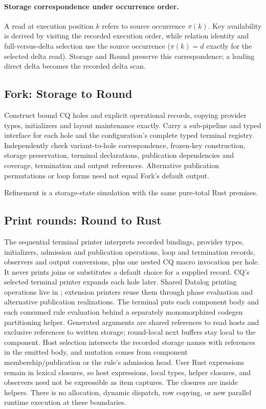 \paragraph{Storage correspondence under occurrence order.}
A read at execution position $k$ refers to source occurrence $\pi(k)$.
Key availability is derived by visiting the recorded execution order, while
relation identity and full-versus-delta selection use the source occurrence
($\pi(k)=d$ exactly for the selected delta read).  Storage and Round preserve
this correspondence; a leading direct delta becomes the recorded delta scan.

\subsection{Fork: Storage to Round}
Construct bound CQ holes and explicit operational records, copying provider
types, initializers and layout maintenance exactly. Carry a sub-pipeline and
typed interface for each hole and the configuration's complete typed terminal
registry. Independently check variant-to-hole correspondence, frozen-key
construction, storage preservation, terminal declarations, publication
dependencies and coverage, termination and output references. Alternative
publication permutations or loop forms need not equal Fork's default output.
\begin{mathpar}
\end{mathpar}
Refinement is a storage-state simulation with the same pure-total Rust premises.

\subsection{Print rounds: Round to Rust}
The sequential terminal printer interprets recorded bindings, provider types,
initializers, admission and publication operations, loop and termination
records, observers and output conversions, plus one nested CQ macro invocation
per hole. It never prints joins or substitutes a default choice for a supplied
record. CQ's selected terminal printer expands each hole later. Shared Datalog
printing operations live in ; extension printers reuse
them through phase evaluation and alternative publication realizations.
The terminal puts each component body and each consumed rule evaluation behind
a separately monomorphized codegen partitioning helper. Generated arguments are
shared references to read hosts and exclusive references to written storage;
round-local next buffers stay local to the component. Host selection intersects
the recorded storage names with references in the emitted body, and mutation
comes from component membership/publication or the rule's admission head.
User Rust expressions remain in lexical closures, so host expressions, local
types, helper closures, and observers need not be expressible as item captures.
The closures are  inside  helpers.
There is no allocation, dynamic dispatch, row copying, or new parallel runtime
execution at these boundaries.

